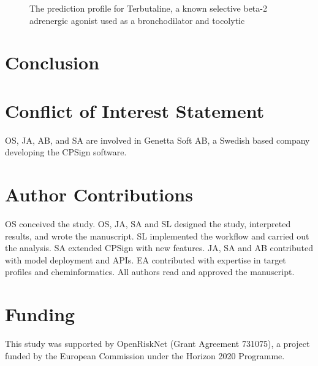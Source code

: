 \documentclass[10pt,article]{memoir}
\newenvironment{wideMinipage}
{ \vskip 1\baselineskip
  \noindent   
  \checkoddpage%
  \ifoddpage%
     \hspace*{-3em}%
  \else%
     \hspace*{-3em}%
  \fi%
  \begin{minipage}{1\textwidth + 6em}
}
{ 
    \end{minipage}
    \vskip 1\baselineskip
}
\begin{document}
\begin{figure}
\begin{wideMinipage}
\begin{minipage}{0.19\textwidth}
    \end{minipage}
    \caption{The prediction profile for Terbutaline, a known selective beta-2 adrenergic agonist  used as a broncho\-dilator and tocolytic \label{fig:web}}
\end{wideMinipage}
\end{figure}

\FloatBarrier
\section*{Conclusion}


\section*{Conflict of Interest Statement}
OS, JA, AB, and SA are involved in Genetta Soft AB, a Swedish based company developing the CPSign software.


\section*{Author Contributions}
OS conceived the study. OS, JA, SA and SL designed the study, interpreted results, and wrote the manuscript. SL implemented the workflow and carried out the analysis. SA extended CPSign with new features. JA, SA and AB contributed with model deployment and APIs. EA contributed with expertise in target profiles and cheminformatics. All authors read and approved the manuscript.



\section*{Funding}
This study was supported by OpenRiskNet (Grant Agreement 731075), a project funded by the European Commission under the Horizon 2020 Programme.
\end{document}
